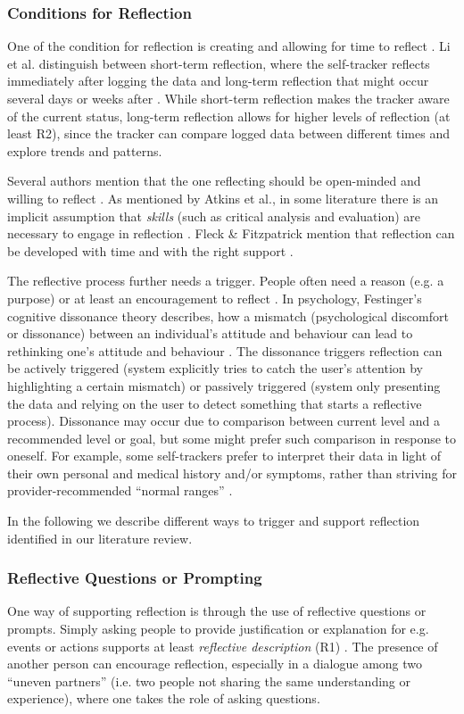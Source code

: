 \subsubsection{Conditions for Reflection}

One of the condition for reflection is creating and allowing for time to reflect \cite{Fleck}. Li et al. distinguish between short-term reflection, where the self-tracker reflects immediately after logging the data and long-term reflection that might occur several days or weeks after \cite{Li2010}. While short-term reflection makes the tracker aware of the current status, long-term reflection allows for higher levels of reflection (at least R2), since the tracker can compare logged data between different times and explore trends and patterns. 

Several authors mention that the one reflecting should be open-minded and willing to reflect \cite{Atkins, Rogers}. As mentioned by Atkins et al., in some literature there is an implicit assumption that \textit{skills} (such as critical analysis and evaluation) are necessary to engage in reflection \cite{Atkins, Rogers}. Fleck \& Fitzpatrick mention that reflection can be developed with time and with the right support \cite{Fleck}. 

The reflective process further needs a trigger. People often need a reason (e.g. a purpose) or at least an encouragement to reflect \cite{Fleck, Mols}. In psychology, Festinger’s cognitive dissonance theory describes, how a mismatch (psychological discomfort or dissonance) between an individual's attitude and behaviour can lead to rethinking one’s attitude and behaviour \cite{Rivera}. The dissonance triggers reflection can be actively triggered (system explicitly tries to catch the user’s attention by highlighting a certain mismatch) or passively triggered (system only presenting the data and relying on the user to detect something that starts a reflective process). Dissonance may occur due to comparison between current level and a recommended level or goal, but some might prefer such comparison in response to oneself. For example, some self-trackers prefer to interpret their data in light of their own personal and medical history and/or symptoms, rather than striving for provider-recommended “normal ranges” \cite{Ancker2015}. 

In the following we describe different ways to trigger and support reflection identified in our literature review. 


\subsubsection{Reflective Questions or Prompting}
One way of supporting reflection is through the use of reflective questions or prompts. Simply asking people to provide justification or explanation for e.g. events or actions supports at least \textit{reflective description} (R1) \cite{Fleck}. The presence of another person can encourage reflection, especially in a dialogue among two “uneven partners” (i.e. two people not sharing the same understanding or experience), where one takes the role of asking questions. 

